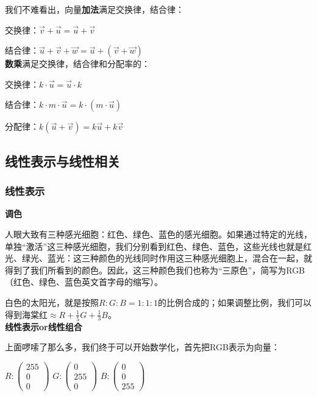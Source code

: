 \documentclass[UTF8]{ctexart}
\begin{document}
我们不难看出，向量\textbf{加法}满足交换律，结合律：

交换律：$\vec{v}+\vec{u}=\vec{u}+\vec{v}$

结合律：$\vec{u}+\vec{v}+\vec{w}=\vec{u}+(\vec{v}+\vec{w})$\\


\textbf{数乘}满足交换律，结合律和分配率的：

交换律：$k \cdot \vec{u} = \vec{u} \cdot k$

结合律：$k \cdot m \cdot \vec{u} = k \cdot (m \cdot \vec{u})$

分配律：$k(\vec{u}+\vec{v})=k\vec{u}+k\vec{v}$

\subsection{线性表示与线性相关}

\subsubsection{线性表示}

\textbf{调色}

人眼大致有三种感光细胞：红色、绿色、蓝色的感光细胞。如果通过特定的光线，单独“激活”这三种感光细胞，我们分别看到红色、绿色、蓝色，这些光线也就是红光、绿光、蓝光：这三种颜色的光线同时作用这三种感光细胞上，混合在一起，就得到了我们所看到的颜色。因此，这三种颜色我们也称为“三原色”，简写为RGB（红色、绿色、蓝色英文首字母的缩写）。

白色的太阳光，就是按照$R:G:B=1:1:1$的比例合成的；如果调整比例，我们可以得到海棠红$\approx R + \frac{1}{5}G+\frac{1}{3}B$。\\



\textbf{线性表示or线性组合}

上面啰嗦了那么多，我们终于可以开始数学化，首先把RGB表示为向量：

$R:\begin{pmatrix} 255\\ 0 \\ 0 \end{pmatrix}$ \qquad
$G:\begin{pmatrix} 0\\ 255 \\ 0 \end{pmatrix}$ \qquad
$B:\begin{pmatrix} 0\\ 0 \\ 255 \end{pmatrix}$ \qquad\\
\end{document}
